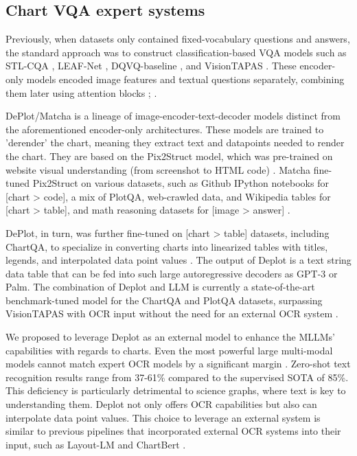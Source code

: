 \documentclass{article}
\begin{document}
\subsection{Chart VQA expert systems}\label{chartvqaexpertsystems}
Previously, when datasets only contained fixed-vocabulary questions and answers, the standard approach was to construct classification-based VQA models such as STL-CQA \cite{singh2020stl}, LEAF-Net \cite{chaudhry2019}, DQVQ-baseline \cite{kafle2018}, and VisionTAPAS \cite{masry2022chartqa}. These encoder-only models encoded image features and textual questions separately, combining them later using attention blocks \cite{chaudhry2019}; \cite{singh2020stl} \cite{kafle2018}.

DePlot/Matcha is a lineage of image-encoder-text-decoder models distinct from the aforementioned encoder-only architectures. These models are trained to 'derender' the chart, meaning they extract text and datapoints needed to render the chart. They are based on the Pix2Struct model, which was pre-trained on website visual understanding (from screenshot to HTML code) \cite{lee2023pix2struct}. Matcha fine-tuned Pix2Struct on various datasets, such as Github IPython notebooks for [chart > code], a mix of PlotQA, web-crawled data, and Wikipedia tables for [chart > table], and math reasoning datasets for [image > answer] \cite{liu2023}. 

DePlot, in turn, was further fine-tuned on [chart > table] datasets, including ChartQA, to specialize in converting charts into linearized tables with titles, legends, and interpolated data point values \cite{liu2022deplot}. The output of Deplot is a text string data table that can be fed into such large autoregressive decoders as GPT-3 or Palm. The combination of Deplot and LLM is currently a state-of-the-art benchmark-tuned model for the ChartQA and PlotQA datasets, surpassing VisionTAPAS with OCR input without the need for an external OCR system \cite{liu2023} \cite{liu2022deplot}.

We proposed to leverage Deplot as an external model to enhance the MLLMs' capabilities with regards to charts. Even the most powerful large multi-modal models cannot match expert OCR models by a significant margin \cite{liu2023hidden}. Zero-shot text recognition results range from 37-61\% compared to the supervised SOTA of 85\%. This deficiency is particularly detrimental to science graphs, where text is key to understanding them. Deplot not only offers OCR capabilities but also can interpolate data point values. This choice to leverage an external system is similar to previous pipelines that incorporated external OCR systems into their input, such as Layout-LM \cite{xu2020layoutlm} and ChartBert \cite{akhtar2023reading}.
\end{document}
